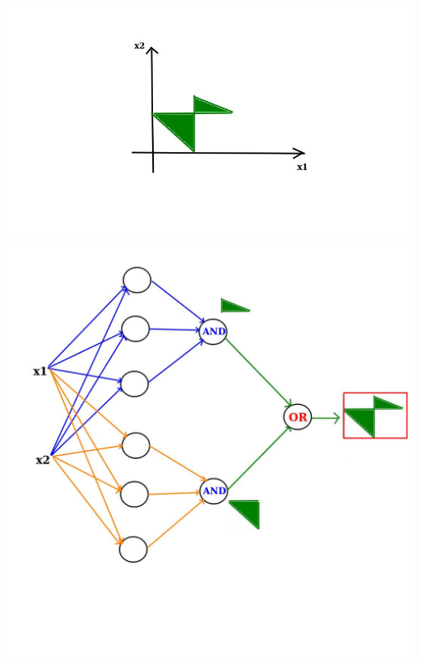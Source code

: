 \documentclass[12pt,aspectratio=169]{beamer}
\begin{document}
\begin{frame}
\begin{center}
\includegraphics[scale=0.7]{two_triangle}
\end{center}
\end{frame}

\begin{frame}
\begin{center}
\includegraphics[scale=0.35]{two_triangle2}
\end{center}
\end{frame}
\end{document}
